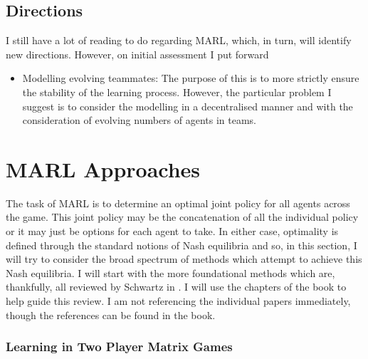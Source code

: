\documentclass[preprint,11pt]{report}
\begin{document}
\subsection{Directions}

I still have a lot of reading to do regarding MARL, which, in turn, will identify new directions.
However, on initial assessment I put forward

\begin{itemize} \item Modelling evolving teammates: The purpose of this is to more strictly ensure
the stability of the learning process. However, the particular problem I suggest is to consider the
modelling in a decentralised manner and with the consideration of evolving numbers of agents in
teams. \end{itemize}


\section{MARL Approaches} \label{sec::MARL Approaches}

The task of MARL is to determine an optimal joint policy for all agents across the game. This joint
policy may be the concatenation of all the individual policy or it may just be options for each
agent to take. In either case, optimality is defined through the standard notions of Nash equilibria
and so, in this section, I will try to consider the broad spectrum of methods which attempt to
achieve this Nash equilibria. I will start with the more foundational methods which are, thankfully,
all reviewed by Schwartz in  \cite{SchwartzMulti-agentApproach}. I will use the chapters of the book
to help guide this review. I am not referencing the individual papers immediately, though the
references can be found in the book.

\subsubsection*{Learning in Two Player Matrix Games}
\end{document}
